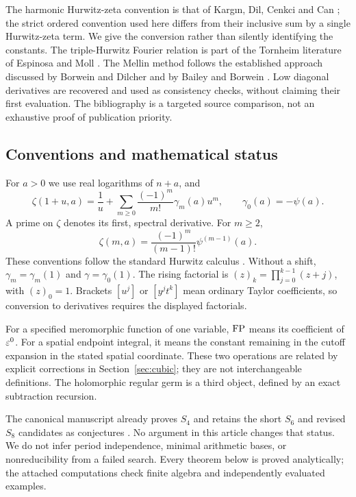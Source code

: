 The harmonic Hurwitz-zeta convention is that of Karg\i n, Dil,
Cenkci and Can \cite{Kargin}; the strict ordered convention used
here differs from their inclusive sum by a single Hurwitz-zeta term.
We give the conversion rather than silently identifying the constants.
The triple-Hurwitz Fourier relation is part of the Tornheim literature
of Espinosa and Moll \cite{EMTornheim}. The Mellin method follows the
established approach discussed by Borwein and Dilcher and by Bailey
and Borwein \cite{BorweinDilcher,BaileyBorwein}. Low diagonal derivatives
are recovered and used as consistency checks, without claiming their
first evaluation. The bibliography is a targeted source comparison,
not an exhaustive proof of publication priority.

\subsection{Conventions and mathematical status}

For $a>0$ we use real logarithms of $n+a$, and
\begin{equation}\label{scope:stieltjes}
 \zeta(1+u,a)=\frac1u+
  \sum_{m\ge0}\frac{(-1)^m}{m!}\gamma_m(a)u^m,
 \qquad \gamma_0(a)=-\psi(a).
\end{equation}
A prime on $\zeta$ denotes its first, spectral derivative. For $m\ge2$,
\begin{equation}\label{scope:polygamma}
 \zeta(m,a)=\frac{(-1)^m}{(m-1)!}\psi^{(m-1)}(a).
\end{equation}
These conventions follow the standard Hurwitz calculus \cite{DLMFHurwitz}.
Without a shift, $\gamma_m=\gamma_m(1)$ and $\gamma=\gamma_0(1)$.
The rising factorial is $(z)_k=\prod_{j=0}^{k-1}(z+j)$, with
$(z)_0=1$.
Brackets $[u^j]$ or $[y^jt^k]$ mean ordinary Taylor coefficients,
so conversion to derivatives requires the displayed factorials.

For a specified meromorphic function of one variable, $\operatorname{FP}$ means its
coefficient of $\varepsilon^0$. For a spatial endpoint integral, it means
the constant remaining in the cutoff expansion in the stated spatial
coordinate. These two operations are related by explicit corrections
in Section~\ref{sec:cubic}; they are not interchangeable definitions.
The holomorphic regular germ is a third object, defined by an exact
subtraction recursion.

The canonical manuscript already proves $S_4$ and retains the short
$S_6$ and revised $S_8$ candidates as conjectures \cite{repomain}.
No argument in this article changes that status. We do not infer
period independence, minimal arithmetic bases, or nonreducibility
from a failed search. Every theorem below is proved analytically;
the attached computations check finite algebra and independently
evaluated examples.
